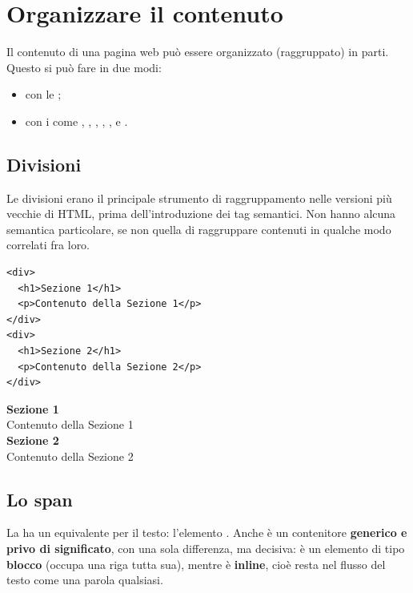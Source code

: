 \section{Organizzare il contenuto}

Il contenuto di una pagina web può essere organizzato (raggruppato) in parti.
Questo si può fare in due modi:

\begin{itemize}
  \item con le  ;
  \item con i  come , , ,
        , ,  e .
\end{itemize}

\subsection{Divisioni}

Le divisioni  erano il principale strumento di raggruppamento nelle
versioni più vecchie di HTML, prima dell'introduzione dei tag semantici. Non
hanno alcuna semantica particolare, se non quella di raggruppare contenuti in
qualche modo correlati fra loro.

\begin{affianco}[0.5]
\begin{lstlisting}[style=html, name=divisioni.html]
<div>
  <h1>Sezione 1</h1>
  <p>Contenuto della Sezione 1</p>
</div>
<div>
  <h1>Sezione 2</h1>
  <p>Contenuto della Sezione 2</p>
</div>
\end{lstlisting}
\risultato
\begin{browser}
  {\Lora\bfseries\LARGE Sezione 1}\\[4pt]
  Contenuto della Sezione 1\\[8pt]
  {\Lora\bfseries\LARGE Sezione 2}\\[4pt]
  Contenuto della Sezione 2
\end{browser}
\end{affianco}

\subsection{Lo span}

La  ha un equivalente per il testo: l'elemento . Anche
 è un contenitore \textbf{generico e privo di significato}, con una
sola differenza, ma decisiva:  è un elemento di tipo \textbf{blocco}
(occupa una riga tutta sua), mentre  è \textbf{inline}, cioè resta nel
flusso del testo come una parola qualsiasi.

